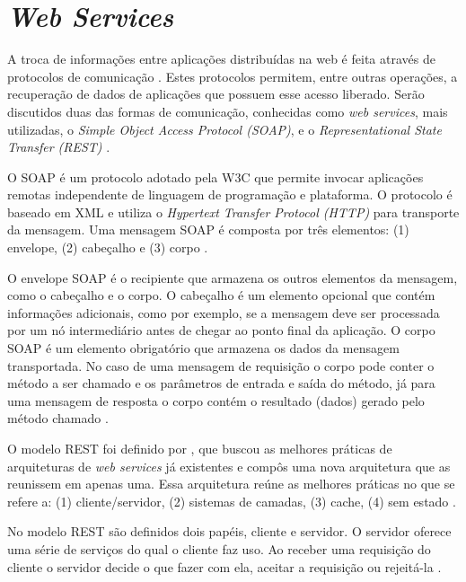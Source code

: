 \section{\textit{Web Services}}
\label{sec:api}

A troca de informações entre aplicações distribuídas na web é feita através de protocolos de 
comunicação \cite{schepke2010avaliaccao}. Estes protocolos permitem, entre outras operações, a recuperação 
de dados de aplicações que possuem esse acesso liberado. Serão discutidos duas das formas de 
comunicação, conhecidas como \textit{web services}, mais utilizadas, o \textit{Simple Object 
Access Protocol (SOAP)}, e o \textit{Representational State Transfer (REST)} \cite{lima2012}.

O SOAP é um protocolo adotado pela W3C que permite invocar aplicações remotas independente de 
linguagem de programação e plataforma. O protocolo é baseado em XML e utiliza o 
\textit{Hypertext Transfer Protocol (HTTP)} para transporte da mensagem. Uma mensagem SOAP é 
composta por três elementos: (1) envelope, (2) cabeçalho e (3) corpo \cite{suda2003soap}.

O envelope SOAP é o recipiente que armazena os outros elementos da mensagem, como o cabeçalho 
e o corpo.  O cabeçalho é um elemento opcional que contém informações adicionais, como por 
exemplo, se a mensagem deve ser processada por um nó intermediário antes de chegar ao ponto 
final da aplicação. O corpo SOAP é um elemento obrigatório que armazena os dados da mensagem 
transportada. No caso de uma mensagem de requisição o corpo pode conter o método a ser 
chamado e os parâmetros de entrada e saída do método, já para uma mensagem de resposta o 
corpo contém o resultado (dados) gerado pelo método chamado \cite{suda2003soap}.

O modelo REST foi definido por , que buscou as melhores práticas de 
arquiteturas de \textit{web services} já existentes e compôs uma nova arquitetura que as 
reunissem em apenas uma. Essa arquitetura reúne as melhores práticas no que se refere a: 
(1) cliente/servidor, (2) sistemas de camadas, (3) cache, (4) sem estado \cite{fielding2000architectural}.

No modelo REST são definidos dois papéis, cliente e servidor. O servidor oferece uma série 
de serviços do qual o cliente faz uso. Ao receber uma requisição do cliente o servidor decide 
o que fazer com ela, aceitar a requisição ou rejeitá-la \cite{fielding2000architectural}.

